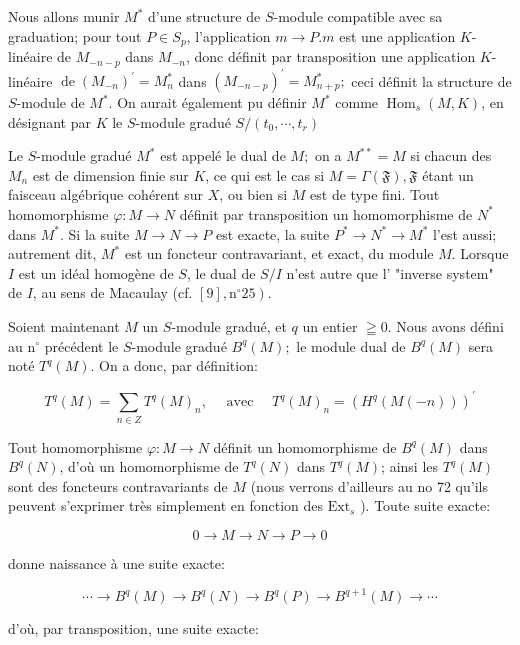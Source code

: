 Nous allons munir $M^{*}$ d'une structure de $S$-module compatible avec sa graduation; pour tout $P \in S_{p}$, l'application $m \rightarrow P . m$ est une application $K$-linéaire de $M_{-n-p}$ dans $M_{-n}$, donc définit par transposition une application $K$-linéaire $\operatorname{de}\left(M_{-n}\right)^{\prime}=M_{n}^{*}$ dans $\left(M_{-n-p}\right)^{\prime}=M_{n+p}^{*} ;$ ceci définit la structure de $S$-module de $M^{*}$. On aurait également pu définir $M^{*}$ comme $\operatorname{Hom}_{s}(M, K)$, en désignant par $K$ le $S$-module gradué $S /\left(t_{0}, \cdots, t_{r}\right)$

Le $S$-module gradué $M^{*}$ est appelé le dual de $M ;$ on a $M^{* *}=M$ si chacun des $M_{n}$ est de dimension finie sur $K$, ce qui est le cas si $M=\Gamma(\mathfrak{F}), \mathfrak{F}$ étant un faisceau algébrique cohérent sur $X$, ou bien si $M$ est de type fini. Tout homomorphisme $\varphi: M \rightarrow N$ définit par transposition un homomorphisme de $N^{*}$ dans $M^{*}$. Si la suite $M \rightarrow N \rightarrow P$ est exacte, la suite $P^{*} \rightarrow N^{*} \rightarrow M^{*}$ l'est aussi; autrement dit, $M^{*}$ est un foncteur contravariant, et exact, du module $M$. Lorsque $I$ est un idéal homogène de $S$, le dual de $S / I$ n'est autre que l' "inverse system" de $I$, au sens de Macaulay (cf. $\left.[9], \mathrm{n}^{\circ} 25\right)$.

Soient maintenant $M$ un $S$-module gradué, et $q$ un entier $\geqq 0 .$ Nous avons défini au $\mathrm{n}^{\circ}$ précédent le $S$-module gradué $B^{q}(M) ;$ le module dual de $B^{q}(M)$ sera noté $T^{q}(M)$. On a donc, par définition:

$$
T^{q}(M)=\sum_{n \in Z} T^{q}(M)_{n}, \quad \text { avec } \quad T^{q}(M)_{n}=\left(H^{q}(M(-n))\right)^{\prime}
$$

Tout homomorphisme $\varphi: M \rightarrow N$ définit un homomorphisme de $B^{q}(M)$ dans $B^{q}(N)$, d'où un homomorphisme de $T^{q}(N)$ dans $T^{q}(M)$; ainsi les $T^{q}(M)$ sont des foncteurs contravariants de $M$ (nous verrons d'ailleurs au no 72 qu'ils peuvent s'exprimer très simplement en fonction des $\mathrm{Ext}_{s}$ ). Toute suite exacte:

$$
0 \rightarrow M \rightarrow N \rightarrow P \rightarrow 0
$$

donne naissance à une suite exacte:

$$
\cdots \rightarrow B^{q}(M) \rightarrow B^{q}(N) \rightarrow B^{q}(P) \rightarrow B^{q+1}(M) \rightarrow \cdots
$$

d'où, par transposition, une suite exacte:

